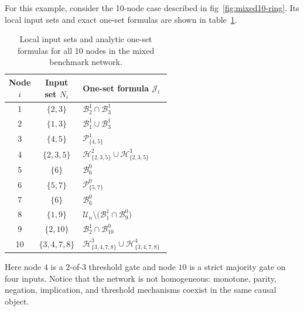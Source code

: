 \documentclass[11pt]{article}
\theoremstyle{definition}
\newcommand{\U}{\mathcal{U}_n}
\newcommand{\J}{\mathcal{J}}
\newcommand{\Band}[2]{\mathcal{B}_{#1}^{#2}}
\newcommand{\Parity}[2]{\mathcal{P}_{#1}^{#2}}
\newcommand{\Weight}[2]{\mathcal{H}_{#1}^{#2}}
\begin{document}
For this example, consider the 10-node case described in fig~\ref{fig:mixed10-ring}. 
Its local input sets and exact one-set formulas are shown in table~\ref{tab:mixed10-node-formulas}.

\begin{table}[H]
\centering
\small
\begin{tabular}{@{}ccp{0.55\linewidth}@{}}
\toprule
\textbf{Node \(i\)} & \textbf{Input set \(N_i\)} & \textbf{One-set formula \(\J_i\)} \\
\midrule
1 & \(\{2,3\}\) & \(\Band{2}{1}\cap\Band{3}{1}\) \\
2 & \(\{1,3\}\) & \(\Band{1}{1}\cup\Band{3}{1}\) \\
3 & \(\{4,5\}\) & \(\Parity{\{4,5\}}{1}\) \\
4 & \(\{2,3,5\}\) & \(\Weight{\{2,3,5\}}{2}\cup\Weight{\{2,3,5\}}{3}\) \\
5 & \(\{6\}\) & \(\Band{6}{0}\) \\
6 & \(\{5,7\}\) & \(\Parity{\{5,7\}}{0}\) \\
7 & \(\{6\}\) & \(\Band{6}{0}\) \\
8 & \(\{1,9\}\) & \(\U\setminus\bigl(\Band{1}{1}\cap\Band{9}{0}\bigr)\) \\
9 & \(\{2,10\}\) & \(\Band{2}{1}\cap\Band{10}{0}\) \\
10 & \(\{3,4,7,8\}\) & \(\Weight{\{3,4,7,8\}}{3}\cup\Weight{\{3,4,7,8\}}{4}\) \\
\bottomrule
\end{tabular}
\caption{Local input sets and analytic one-set formulas for all 10 nodes 
in the mixed benchmark network.}
\label{tab:mixed10-node-formulas}
\end{table}


Here node \(4\) is a \(2\)-of-\(3\) threshold gate and node \(10\) is a strict majority gate on four inputs. 
Notice that the network is not homogeneous: monotone, parity, negation, implication, 
and threshold mechanisms coexist in the same causal object.
\end{document}
